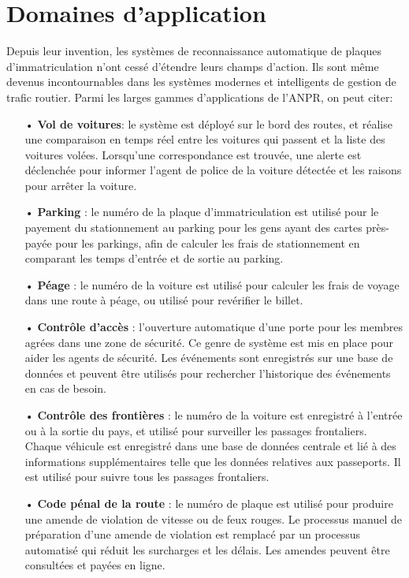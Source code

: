 \section{Domaines d'application}
Depuis leur invention, les systèmes de reconnaissance automatique de plaques d’immatriculation n’ont cessé d’étendre leurs champs d’action. Ils sont même devenus incontournables dans les systèmes modernes et intelligents de gestion de trafic routier. Parmi les larges gammes d’applications de l’ANPR, on peut citer: 
    \begin{itemize}
        \item[•]\textbf{Vol de voitures}: le système est déployé sur le bord des routes, et réalise une comparaison en temps réel entre les voitures qui passent et la liste des voitures volées. Lorsqu’une correspondance est trouvée, une alerte est déclenchée pour informer l’agent de police de la voiture détectée et les raisons pour arrêter la voiture.
        \item[•]\textbf{Parking} : le numéro de la plaque d’immatriculation est utilisé pour le payement du stationnement au parking pour les gens ayant des cartes près-payée pour les parkings, afin de calculer les frais de stationnement en comparant les temps d’entrée et de sortie au parking.
        \item[•]\textbf{Péage} : le numéro de la voiture est utilisé pour calculer les frais de voyage dans une route à péage, ou utilisé pour revérifier le billet.
        \item[•]\textbf{Contrôle d’accès} : l’ouverture automatique d’une porte pour les membres agrées dans une zone de sécurité. Ce genre de système est mis en place pour aider les agents de sécurité. Les événements sont enregistrés sur une base de données et peuvent être utilisés pour rechercher l’historique des événements en cas de besoin.
        \item[•]\textbf{Contrôle des frontières} : le numéro de la voiture est enregistré à l’entrée ou à la sortie du pays, et utilisé pour surveiller les passages frontaliers. Chaque véhicule est enregistré dans une base de données centrale et lié à des informations supplémentaires telle que les données relatives aux passeports. Il est utilisé pour suivre tous les passages frontaliers.
        \item[•]\textbf{Code pénal de la route} : le numéro de plaque est utilisé pour produire une amende de violation de vitesse ou de feux rouges. Le processus manuel de préparation d’une amende de violation
        est remplacé par un processus automatisé qui réduit les surcharges et les délais. Les amendes peuvent être consultées et payées en ligne. \cite{HindeThesis}         
    \end{itemize}